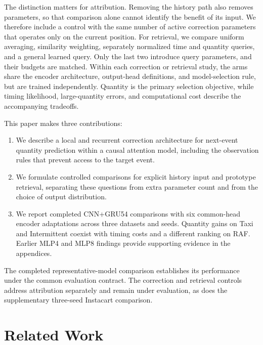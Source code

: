 \documentclass[runningheads]{llncs}
\begin{document}
The distinction matters for attribution. Removing the history path also removes parameters, so that comparison alone cannot identify the benefit of its input. We therefore include a control with the same number of active correction parameters that operates only on the current position. For retrieval, we compare uniform averaging, similarity weighting, separately normalized time and quantity queries, and a general learned query. Only the last two introduce query parameters, and their budgets are matched. Within each correction or retrieval study, the arms share the encoder architecture, output-head definitions, and model-selection rule, but are trained independently. Quantity is the primary selection objective, while timing likelihood, large-quantity errors, and computational cost describe the accompanying tradeoffs.

This paper makes three contributions:
\begin{enumerate}
\item We describe a local and recurrent correction architecture for next-event quantity prediction within a causal attention model, including the observation rules that prevent access to the target event.
\item We formulate controlled comparisons for explicit history input and prototype retrieval, separating these questions from extra parameter count and from the choice of output distribution.
\item We report completed CNN+GRU54 comparisons with six common-head encoder adaptations across three datasets and seeds. Quantity gains on Taxi and Intermittent coexist with timing costs and a different ranking on RAF. Earlier MLP4 and MLP8 findings provide supporting evidence in the appendices.
\end{enumerate}
The completed representative-model comparison establishes its performance under the common evaluation contract. The correction and retrieval controls address attribution separately and remain under evaluation, as does the supplementary three-seed Instacart comparison.

\section{Related Work}
\end{document}
